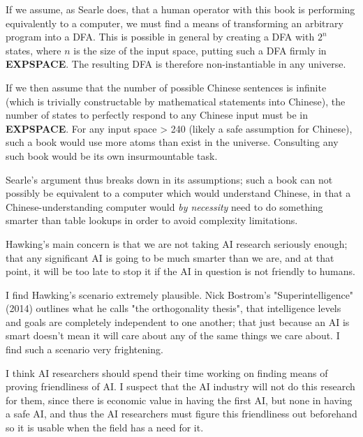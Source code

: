 \documentclass[12pt]{article}
\begin{document}
If we assume, as Searle does, that a human operator with this book is performing equivalently to a computer, we must
find a means of transforming an arbitrary program into a DFA. This is possible in general by creating a DFA with $2^n$
states, where $n$ is the size of the input space, putting such a DFA firmly in \textbf{EXPSPACE}. The resulting DFA is
therefore non-instantiable in any universe.

If we then assume that the number of possible Chinese sentences is infinite (which is trivially constructable by
mathematical statements into Chinese), the number of states to perfectly respond to any Chinese input must be in
\textbf{EXPSPACE}. For any input space > 240 (likely a safe assumption for Chinese), such a book would use more atoms
than exist in the universe. Consulting any such book would be its own insurmountable task.

Searle's argument thus breaks down in its assumptions; such a book can not possibly be equivalent to a computer which
would understand Chinese, in that a Chinese-understanding computer would \textit{by necessity} need to do something
smarter than table lookups in order to avoid complexity limitations.


\problemsub
Hawking's main concern is that we are not taking AI research seriously enough; that any significant AI is going to be
much smarter than we are, and at that point, it will be too late to stop it if the AI in question is not friendly to
humans.

\problemsub
I find Hawking's scenario extremely plausible. Nick Bostrom's "Superintelligence" (2014) outlines what he calls "the
orthogonality thesis", that intelligence levels and goals are completely independent to one another; that just because
an AI is smart doesn't mean it will care about any of the same things we care about. I find such a scenario very
frightening.

\problemsub
I think AI researchers should spend their time working on finding means of proving friendliness of AI. I suspect that
the AI industry will not do this research for them, since there is economic value in having the first AI, but none in
having a safe AI, and thus the AI researchers must figure this friendliness out beforehand so it is usable when the
field has a need for it.
\end{document}
